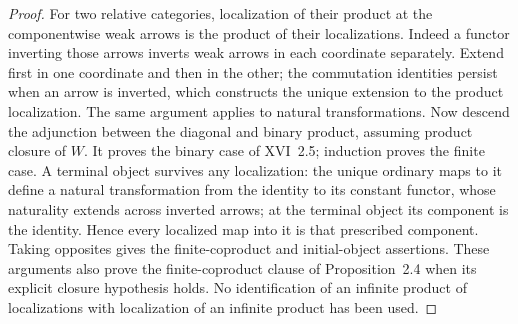 \begin{proof}
For two relative categories, localization of their product at the
componentwise weak arrows is the product of their localizations.
Indeed a functor inverting those arrows inverts weak arrows in each
coordinate separately. Extend first in one coordinate and then in the
other; the commutation identities persist when an arrow is inverted,
which constructs the unique extension to the product localization.
The same argument applies to natural transformations. Now descend the
adjunction between the diagonal and binary product, assuming product
closure of $W$. It proves the binary case of XVI~2.5; induction proves
the finite case. A terminal object survives any localization: the
unique ordinary maps to it define a natural transformation from the
identity to its constant functor, whose naturality extends across
inverted arrows; at the terminal object its component is the identity.
Hence every localized map into it is that prescribed component.
Taking opposites gives the
finite-coproduct and initial-object assertions. These arguments also
prove the finite-coproduct clause of Proposition~2.4 when its explicit
closure hypothesis holds. No identification of an infinite product of
localizations with localization of an infinite product has been used.
\end{proof}

